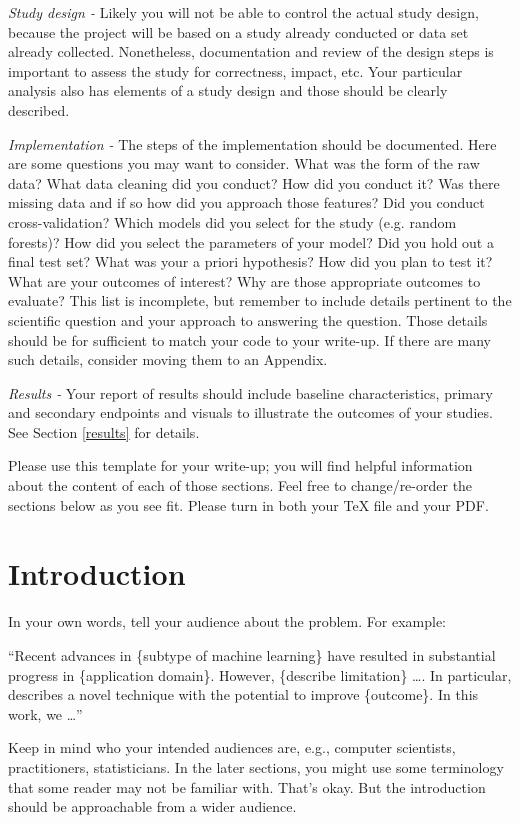 \documentclass[twoside,11pt]{article}
\begin{document}
\emph{Study design -} Likely you will not be able to control the actual study design, because the project will be based on a study already conducted or data set already collected. Nonetheless, documentation and review of the design steps is important to assess the study for correctness, impact, etc. Your particular analysis also has elements of a study design and those should be clearly described.

\emph{Implementation -} The steps of the implementation should be documented. Here are some questions you may want to consider. What was the form of the raw data? What data cleaning did you conduct? How did you conduct it? Was there missing data and if so how did you approach those features? Did you conduct cross-validation? Which models did you select for the study (e.g. random forests)? How did you select the parameters of your model? Did you hold out a final test set? What was your a priori hypothesis? How did you plan to test it? What are your outcomes of interest? Why are those appropriate outcomes to evaluate? This list is incomplete, but remember to include details pertinent to the scientific question and your approach to answering the question. Those details should be for sufficient to match your code to your write-up. If there are many such details, consider moving them to an Appendix.

\emph{Results -} Your report of results should include baseline characteristics, primary and secondary endpoints and visuals to illustrate the outcomes of your studies. See Section \ref{results} for details.

Please use this template for your write-up; you will find helpful information about the content of each of those sections. Feel free to change/re-order the sections below as you see fit. Please turn in both your TeX file and your PDF.


\section{Introduction}
In your own words, tell your audience about the problem. For example:

``Recent advances in \{subtype of machine learning\} \citep{cite1} have resulted in substantial progress in \{application domain\}. However, \{describe limitation\} \dots.
In particular, \citet{cite2} describes a novel technique with the potential to improve \{outcome\}.
In this work, we \dots''

Keep in mind who your intended audiences are, e.g., computer scientists, practitioners, statisticians.
In the later sections, you might use some terminology that some reader may not be familiar with.
That's okay. But the introduction should be approachable from a wider audience.
\end{document}
